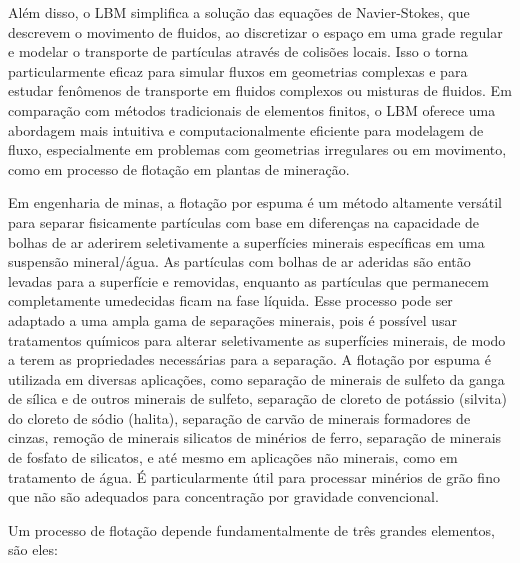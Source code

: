 \documentclass[12pt]{article}
\begin{document}
Além disso, o LBM simplifica a solução das equações de Navier-Stokes, que descrevem o movimento de fluidos, ao discretizar o espaço em uma grade regular e modelar o transporte de partículas através de colisões locais. Isso o torna particularmente eficaz para simular fluxos em geometrias complexas e para estudar fenômenos de transporte em fluidos complexos ou misturas de fluidos. Em comparação com métodos tradicionais de elementos finitos, o LBM oferece uma abordagem mais intuitiva e computacionalmente eficiente para modelagem de fluxo, especialmente em problemas com geometrias irregulares ou em movimento, como em processo de flotação em plantas de mineração.\newline


Em engenharia de minas, a flotação por espuma é um método altamente versátil para separar fisicamente partículas com base em diferenças na capacidade de bolhas de ar aderirem seletivamente a superfícies minerais específicas em uma suspensão mineral/água. As partículas com bolhas de ar aderidas são então levadas para a superfície e removidas, enquanto as partículas que permanecem completamente umedecidas ficam na fase líquida. Esse processo pode ser adaptado a uma ampla gama de separações minerais, pois é possível usar tratamentos químicos para alterar seletivamente as superfícies minerais, de modo a terem as propriedades necessárias para a separação. A flotação por espuma é utilizada em diversas aplicações, como separação de minerais de sulfeto da ganga de sílica e de outros minerais de sulfeto, separação de cloreto de potássio (silvita) do cloreto de sódio (halita), separação de carvão de minerais formadores de cinzas, remoção de minerais silicatos de minérios de ferro, separação de minerais de fosfato de silicatos, e até mesmo em aplicações não minerais, como em tratamento de água. É particularmente útil para processar minérios de grão fino que não são adequados para concentração por gravidade convencional.\newline

Um processo de flotação depende fundamentalmente de três grandes elementos, são eles:
\end{document}
